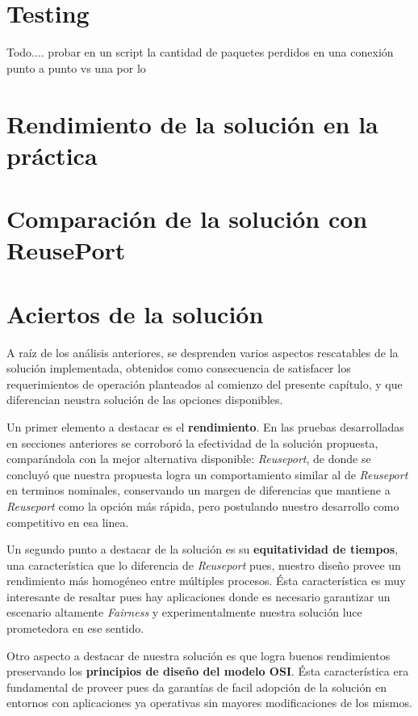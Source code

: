 \section{Testing}
Todo.... probar en un script la cantidad de paquetes perdidos en una conexión punto a punto vs una por lo

\section{Rendimiento de la solución en la práctica}

\section{Comparación de la solución con ReusePort}

\section{Aciertos de la solución}

A raíz de los análisis anteriores, se desprenden varios aspectos rescatables de la solución implementada, obtenidos como consecuencia de satisfacer los requerimientos de operación planteados al comienzo del presente capítulo, y que diferencian neustra solución de las opciones disponibles.

Un primer elemento a destacar es el \textbf{rendimiento}. En las pruebas desarrolladas en secciones anteriores se corroboró la efectividad de la solución propuesta, comparándola con la mejor alternativa disponible: \emph{Reuseport}, de donde se concluyó que nuestra propuesta logra un comportamiento similar al de \emph{Reuseport} en terminos nominales, conservando un margen de diferencias que mantiene a \emph{Reuseport} como la opción más rápida, pero postulando nuestro desarrollo como competitivo en esa linea.

Un segundo punto a destacar de la solución es su \textbf{equitatividad de tiempos}, una característica que lo diferencia de \emph{Reuseport} pues, nuestro diseño provee un rendimiento más homogéneo entre múltiples procesos. Ésta característica es muy interesante de resaltar pues hay aplicaciones donde es necesario garantizar un escenario altamente \emph{Fairness} y experimentalmente nuestra solución luce prometedora en ese sentido.

Otro aspecto a destacar de nuestra solución es que logra buenos rendimientos preservando los \textbf{principios de diseño del modelo OSI}. Ésta característica era fundamental de proveer pues da garantías de facil adopción de la solución en entornos con aplicaciones ya operativas sin mayores modificaciones de los mismos.

